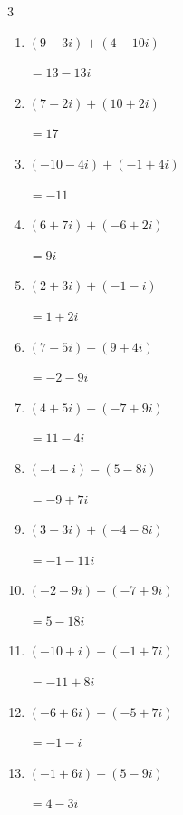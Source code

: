 \begin{multicols}{3}
\begin{enumerate}
  \item $\displaystyle (9-3i) + (4-10i)$

        $\displaystyle =13-13i$

  \item $\displaystyle (7-2i) + (10+2i)$

        $\displaystyle =17$

  \item $\displaystyle (-10-4i) + (-1+4i)$

        $\displaystyle =-11$

  \item $\displaystyle (6+7i) + (-6+2i)$

        $\displaystyle =9i$

  \item $\displaystyle (2+3i) + (-1-i)$

        $\displaystyle =1+2i$

  \item $\displaystyle (7-5i) - (9+4i)$

        $\displaystyle =-2-9i$

  \item $\displaystyle (4+5i) - (-7+9i)$

        $\displaystyle =11-4i$

\columnbreak %

\resetques

  \item $\displaystyle (-4-i) - (5-8i)$

        $\displaystyle =-9+7i$

  \item $\displaystyle (3-3i) + (-4-8i)$

        $\displaystyle =-1-11i$

  \item $\displaystyle (-2-9i) - (-7+9i)$

        $\displaystyle =5-18i$

  \item $\displaystyle (-10+i) + (-1+7i)$

        $\displaystyle =-11+8i$

  \item $\displaystyle (-6+6i) - (-5+7i)$

        $\displaystyle =-1-i$

  \item $\displaystyle (-1+6i) + (5-9i)$

        $\displaystyle =4-3i$


\end{enumerate}
\end{multicols}

